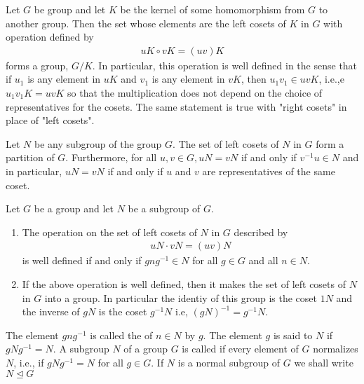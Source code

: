 \documentclass[10pt,a4paper]{report}
\begin{document}
\begin{theorem}
Let $G$ be group and let $K$ be the kernel of some homomorphism from $G$ to another group.  Then the set whose elements are the left cosets of $K$ in $G$ with operation defined by
\begin{align*}
	uK \circ vK=(uv)K
\end{align*}forms a group, $G/K$.  In particular, this operation is well defined in the sense that if $u_1$ is any element in $uK$ and $v_1$ is any element in $vK$, then $u_1v_1 \in uvK$, i.e.,e $u_1v_1K = uvK$ so that the multiplication does not depend on the choice of representatives for the cosets.  The same statement is true with "right cosets" in place of "left cosets".
\end{theorem}

\begin{prop} Let $N$ be any subgroup of the group $G$.  The set of left cosets of $N$ in $G$ form a partition of $G$.  Furthermore, for all $u,v \in G, uN=vN$ if and only if $v^{-1}u\in N$ and in particular, $uN=vN$ if and only if $u$ and $v$ are representatives of the same coset.
\end{prop}

\begin{prop} Let $G$ be a group and let $N$ be a subgroup of $G$.
\begin{enumerate}
	\item The operation on the set of left cosets of $N$ in $G$ described by
	\begin{align*}
		uN\cdot vN=(uv)N
	\end{align*}is well defined if and only if $gng^{-1}\in N$ for all $g \in G$ and all $n \in N$.
	\item If the above operation is well defined, then it makes the set of left cosets of $N$ in $G$ into a group.  In particular the identiy of this group is the coset $1N$ and the inverse of $gN$ is the coset $g^{-1}N$ i.e, $(gN)^{-1}=g^{-1}N$.
\end{enumerate}
\end{prop}

\newcommand{\NORMAL}{\trianglelefteq}
\begin{definition}The element $gng^{-1}$ is called the  of $n \in N$ by $g$.  The element $g$ is said to  $N$ if $gNg^{-1} = N$.  A subgroup $N$ of a group $G$ is called  if every element of $G$ normalizes $N$, i.e., if $gNg^{-1}=N$ for all $g \in G$.  If $N$ is a normal subgroup of $G$ we shall write $N \NORMAL G$
\end{definition}
\end{document}
